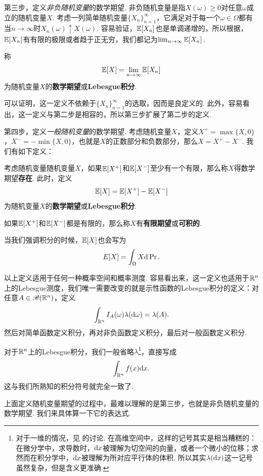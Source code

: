 第三步，定义\textit{非负随机变量}的数学期望. 非负随机变量是指$X(\omega)\geq 0$对任意$\omega$成立的随机变量$X$. 考虑一列简单随机变量$\{X_n\}_{n=1}^\infty$，它满足对于每一个$\omega\in\Omega$都有当$n\to\infty$时$X_n(\omega)\uparrow X(\omega)$. 容易验证，$\mathbb{E}[X_n]$也是单调递增的，所以根据，$\mathbb{E}[X_n]$有有限的极限或者趋于正无穷，我们都记为$\lim_{n\to\infty} \mathbb{E}[X_n]$.

\begin{definition}
称
\[\mathbb{E}[X]=\lim_{n\to\infty}\mathbb{E}[X_n]\]
为随机变量$X$的\textbf{数学期望}或\textbf{Lebesgue积分}. 
\end{definition}

可以证明，这一定义不依赖于$\{X_n\}_{n=1}^\infty$的选取，因而是良定义的. 此外，容易看出，这一定义与第二步是相容的，所以第三步扩展了第二步的定义. 

第四步，定义\textit{一般随机变量}的数学期望. 考虑随机变量$X$，定义$X^+=\max\{X,0\}$，$X^-=-\min\{X,0\}$，也就是$X$的正数部分和负数部分，那么$X=X^+-X^-$. 我们有如下定义：

\begin{definition}
考虑随机变量随机变量$X$，如果$\mathbb{E}[X^+]$和$\mathbb{E}[X^-]$至少有一个有限，那么称$X$得数学期望\textbf{存在}. 此时，定义
\[\mathbb{E}[X]=\mathbb{E}[X^+]-\mathbb{E}[X^-]\]
为随机变量$X$的\textbf{数学期望}或\textbf{Lebesgue积分}. 

如果$\mathbb{E}[X^+]$和$\mathbb{E}[X^-]$都是有限的，那么称$X$有\textbf{有限期望}或\textbf{可积的}. 
\end{definition}

当我们强调积分的时候，$\mathbb{E}[X]$也会写为
\[E[X]=\int_\Omega X\mathrm{d}\Pr.\]

以上定义适用于任何一种概率空间和概率测度. 容易看出来，这一定义也适用于$\mathbb{R}^n$上的Lebesgue测度，我们唯一需要改变的就是示性函数的Lebesgue积分的定义：对任意$A\in\mathscr{B}(\mathbb{R}^n)$，定义
\[\int_{\mathbb{R}^n} I_A(\omega)\lambda(\mathrm{d} \omega)=\lambda(A).\]
然后对简单函数定义积分，再对非负函数定义积分，最后对一般函数定义积分. 

对于$\mathbb{R}^n$上的Lebesgue积分，我们一般省略$\lambda$\footnote{对于一维的情况，见 的讨论. 在高维空间中，这样的记号其实是相当糟糕的：在微分学中，求导数时，$\mathrm{d} x$被理解为切空间的向量，或者一个微小的位移；求然而在积分学中，$\mathrm{d} x$被理解为所对应平行体的体积. 所以其实$\lambda(\mathrm{d} x)$这一记号虽然复杂，但是含义更准确. }，直接写成
\[\int_{\mathbb{R}^n} f(x)\mathrm{d} x.\]
这与我们所熟知的积分符号就完全一致了. 

上面定义随机变量期望的过程中，最难以理解的是第三步，也就是非负随机变量的数学期望. 我们来具体算一下它的表达式. 

